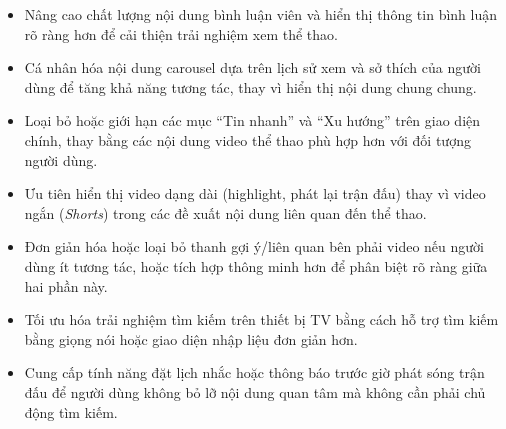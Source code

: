 \documentclass[a4paper,12pt]{article}
\begin{document}
\begin{itemize}
    \item Nâng cao chất lượng nội dung bình luận viên và hiển thị thông tin bình luận rõ ràng hơn để cải thiện trải nghiệm xem thể thao.
    
    \item Cá nhân hóa nội dung carousel dựa trên lịch sử xem và sở thích của người dùng để tăng khả năng tương tác, thay vì hiển thị nội dung chung chung.
    
    \item Loại bỏ hoặc giới hạn các mục ``Tin nhanh'' và ``Xu hướng'' trên giao diện chính, thay bằng các nội dung video thể thao phù hợp hơn với đối tượng người dùng.
    
    \item Ưu tiên hiển thị video dạng dài (highlight, phát lại trận đấu) thay vì video ngắn (\textit{Shorts}) trong các đề xuất nội dung liên quan đến thể thao.
    
    \item Đơn giản hóa hoặc loại bỏ thanh gợi ý/liên quan bên phải video nếu người dùng ít tương tác, hoặc tích hợp thông minh hơn để phân biệt rõ ràng giữa hai phần này.
    
    \item Tối ưu hóa trải nghiệm tìm kiếm trên thiết bị TV bằng cách hỗ trợ tìm kiếm bằng giọng nói hoặc giao diện nhập liệu đơn giản hơn.
    
    \item Cung cấp tính năng đặt lịch nhắc hoặc thông báo trước giờ phát sóng trận đấu để người dùng không bỏ lỡ nội dung quan tâm mà không cần phải chủ động tìm kiếm.
\end{itemize}
\end{document}
